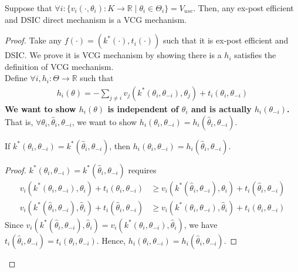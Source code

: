 \documentclass[11pt]{elegantbook}
\begin{document}
\begin{proposition}\label{prop:Uniq_VCG_mechanism}
    Suppose that $\forall i: \{v_i(\cdot,\theta_i): K \rightarrow \mathbb{R}\mid \theta_i\in\Theta_i\}=V_{usc}$. Then, any ex-post efficient and DSIC direct mechanism is a VCG mechanism.
\end{proposition}
\begin{proof}
    Take any $f(\cdot)=\left(k^*(\cdot),t_i(\cdot)\right)$ such that it is ex-post efficient and DSIC. We prove it is VCG mechanism by showing there is a $h_{i}$ satisfies the definition of VCG mechanism.\\
    Define $\forall i, h_i:\Theta \rightarrow \mathbb{R}$ such that
    \begin{equation}
        \begin{aligned}
            h_i(\theta)=-\sum_{j\neq i}v_j(k^*(\theta_i,\theta_{-i}),\theta_j)+t_i(\theta_i,\theta_{-i})
        \end{aligned}
        \nonumber
    \end{equation}
    \textbf{We want to show $h_i(\theta)$ is independent of $\theta_i$ and is actually $h_i(\theta_{-i})$.}\\
    That is, $\forall \theta_i,\hat{\theta}_i,\theta_{-i}$, we want to show $h_i(\theta_i,\theta_{-i})=h_i(\hat{\theta}_i,\theta_{-i})$.
    \begin{lemma}\label{lemma:k_h}
        If $k^*(\theta_i,\theta_{-i})=k^*(\hat{\theta}_i,\theta_{-i})$, then $h_i(\theta_i,\theta_{-i})=h_i(\hat{\theta}_i,\theta_{-i})$.
    \end{lemma}
    \begin{proof}
        $k^*(\theta_i,\theta_{-i})=k^*(\hat{\theta}_i,\theta_{-i})$ requires
        \begin{equation}
            \begin{aligned}
                v_i(k^*(\theta_i,\theta_{-i}),\theta_i)+t_i(\theta_i,\theta_{-i})&\geq v_i(k^*(\hat{\theta}_i,\theta_{-i}),\theta_i)+t_i(\hat{\theta}_i,\theta_{-i})\\
                v_i(k^*(\hat{\theta}_i,\theta_{-i}),\hat{\theta}_i)+t_i(\hat{\theta}_i,\theta_{-i})&\geq v_i(k^*(\theta_i,\theta_{-i}),\hat{\theta}_i)+t_i(\theta_i,\theta_{-i})
            \end{aligned}
            \nonumber
        \end{equation}
        Since $v_i(k^*(\hat{\theta}_i,\theta_{-i}),\hat{\theta}_i)=v_i(k^*(\theta_i,\theta_{-i}),\hat{\theta}_i)$, we have $t_i(\hat{\theta}_i,\theta_{-i})=t_i(\theta_i,\theta_{-i})$. Hence, $h_i(\theta_i,\theta_{-i})=h_i(\hat{\theta}_i,\theta_{-i})$.

\end{proof}
\end{proof}
\end{document}
